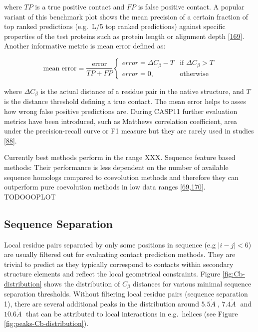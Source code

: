 \documentclass[11pt,a4paper,twoside]{book}
\newcommand{\Cb}{C_\beta}
\newcommand{\angstrom}{\mathring{A} \;}
\theoremstyle{definition}
\theoremstyle{definition}
\theoremstyle{remark}
\begin{document}
where \(TP\) is a true positive contact and \(FP\) is false positive
contact. A popular variant of this benchmark plot shows the mean
precision of a certain fraction of top ranked predictions (e.g.~L/5 top
ranked predictions) against specific properties of the test proteins
such as protein length or alignment depth
{[}\protect\hyperlink{ref-Ashkenazy2009}{169}{]}. Another informative
metric is mean error defined as:

\begin{equation}
    \textrm{mean error}  = \frac{\textrm{error}}{TP + FP} 
        \begin{cases}
            error = \Delta\Cb - T & \text{if } \Delta\Cb > T\\
            error = 0, &\text{otherwise }
        \end{cases}
\end{equation}

where \(\Delta\Cb\) is the actual distance of a residue pair in the
native structure, and \(T\) is the distance threshold defining a true
contact. The mean error helps to asses how wrong false positive
predictions are. During CASP11 further evaluation metrics have been
introduced, such as Matthews correlation coefficient, area under the
precision-recall curve or F1 measure but they are rarely used in studies
{[}\protect\hyperlink{ref-Monastyrskyy2015}{88}{]}.

Currently best methods perform in the range XXX. Sequence feature based
methods: Their performance is less dependent on the number of available
sequence homologs compared to coevolution methods and therefore they can
outperform pure coevolution methods in low data ranges
{[}\protect\hyperlink{ref-Wang2013}{69},\protect\hyperlink{ref-Kosciolek2015a}{170}{]}.
TODOOOPLOT

\subsection{Sequence Separation}\label{seq-sep}

Local residue pairs separated by only some positions in sequence (e.g
\(|i-j| < 6\)) are usually filtered out for evaluating contact
prediction methods. They are trivial to predict as they typically
correspond to contacts within secondary structure elements and reflect
the local geometrical constraints. Figure \ref{fig:Cb-distribution}
shows the distribution of \(\Cb\) distances for various minimal sequence
separation thresholds. Without filtering local residue pairs (sequence
separation 1), there are several additional peaks in the distribution
around \(5.5\angstrom\), \(7.4\angstrom\) and \(10.6\angstrom\) that can
be attributed to local interactions in e.g.~helices (see Figure
\ref{fig:peaks-Cb-distribution}).
\end{document}
